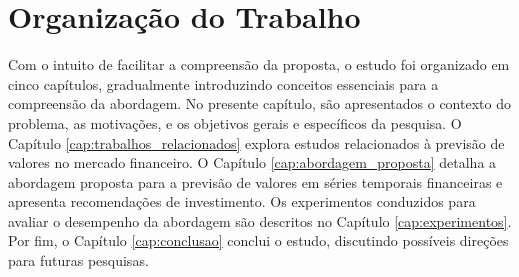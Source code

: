 \section{Organização do Trabalho}
\label{subsec:organização}
Com o intuito de facilitar a compreensão da proposta, o estudo foi organizado em cinco capítulos, gradualmente introduzindo conceitos essenciais para a compreensão da abordagem. No presente capítulo, são apresentados o contexto do problema, as motivações, e os objetivos gerais e específicos da pesquisa. O Capítulo \ref{cap:trabalhos_relacionados} explora estudos relacionados à previsão de valores no mercado financeiro. O Capítulo \ref{cap:abordagem_proposta} detalha a abordagem proposta para a previsão de valores em séries temporais financeiras e apresenta recomendações de investimento. Os experimentos conduzidos para avaliar o desempenho da abordagem são descritos no Capítulo \ref{cap:experimentos}. Por fim, o Capítulo \ref{cap:conclusao} conclui o estudo, discutindo possíveis direções para futuras pesquisas.

\newpage

